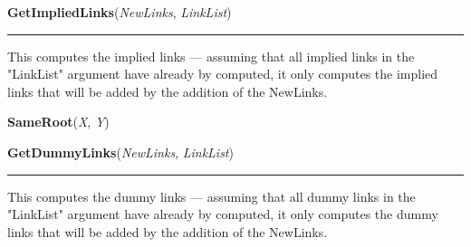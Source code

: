    \vspace{0.5ex}

\hspace{.8\funcindent}\begin{boxedminipage}{\funcwidth}

    \raggedright \textbf{GetImpliedLinks}(\textit{NewLinks}, \textit{LinkList})

    \vspace{-1.5ex}

    \rule{\textwidth}{0.5\fboxrule}
\setlength{\parskip}{2ex}
    This computes the implied links --- assuming that all implied links in 
    the "LinkList" argument have already by computed, it only computes the 
    implied links that will be added by the addition of the NewLinks.

\setlength{\parskip}{1ex}
    \end{boxedminipage}

    \label{System:LinkManagement:SameRoot}

    \vspace{0.5ex}

\hspace{.8\funcindent}\begin{boxedminipage}{\funcwidth}

    \raggedright \textbf{SameRoot}(\textit{X}, \textit{Y})

\setlength{\parskip}{2ex}
\setlength{\parskip}{1ex}
    \end{boxedminipage}

    \label{System:LinkManagement:GetDummyLinks}

    \vspace{0.5ex}

\hspace{.8\funcindent}\begin{boxedminipage}{\funcwidth}

    \raggedright \textbf{GetDummyLinks}(\textit{NewLinks}, \textit{LinkList})

    \vspace{-1.5ex}

    \rule{\textwidth}{0.5\fboxrule}
\setlength{\parskip}{2ex}
    This computes the dummy links --- assuming that all dummy links in the 
    "LinkList" argument have already by computed, it only computes the 
    dummy links that will be added by the addition of the NewLinks.

\setlength{\parskip}{1ex}
    \end{boxedminipage}

